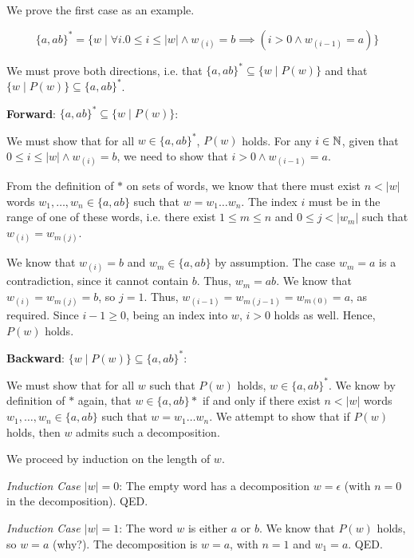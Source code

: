 \begin{exercise}{}
\begin{solution}
    We prove the first case as an example.

    \begin{equation*}
      \{a,ab\}^* = \{w \mid \forall i. 0 \le i \le |w| \land w_{(i)} = b \implies (i > 0 \land w_{(i - 1)} = a)\}
    \end{equation*}

    We must prove both directions, i.e. that \(\{a,ab\}^* \subseteq \{w \mid
    P(w)\}\) and that \(\{w \mid P(w)\} \subseteq \{a,ab\}^*\).

    \noindent
    \textbf{Forward}: \(\{a,ab\}^* \subseteq \{w \mid P(w)\}\):

    We must show that for all \(w \in \{a,ab\}^*\), \(P(w)\) holds. For any \(i
    \in \mathbb{N}\), given that \(0 \le i \le |w| \land w_{(i)} = b\), we need
    to show that \(i > 0 \land w_{(i - 1)} = a\).
    
    From the definition of \(*\) on sets of words, we know that there must exist
    \(n < |w|\) words \(w_1, \ldots, w_n \in \{a, ab\}\) such that \(w = w_1
    \ldots w_n\). The index \(i\) must be in the range of one of these words,
    i.e. there exist \(1 \leq m \leq n\) and \(0 \leq j < |w_m|\) such that
    \(w_{(i)} = w_{m(j)}\). 

    We know that \(w_{(i)} = b\) and \(w_{m} \in \{a, ab\}\) by assumption. The
    case \(w_m = a\) is a contradiction, since it cannot contain \(b\). Thus,
    \(w_m = ab\). We know that \(w_{(i)} = w_{m(j)} = b\), so \(j = 1\). Thus,
    \(w_{(i - 1)} = w_{m(j - 1)} = w_{m(0)} = a\), as required. Since \(i - 1
    \geq 0\), being an index into \(w\), \(i > 0\) holds as well. Hence,
    \(P(w)\) holds.

    \noindent
    \textbf{Backward}: \(\{w \mid P(w)\} \subseteq \{a,ab\}^*\):

    We must show that for all \(w\) such that \(P(w)\) holds, \(w \in
    \{a,ab\}^*\). We know by definition of \(*\) again, that \(w \in \{a,
    ab\}*\) if and only if there exist \(n < |w|\) words \(w_1, \ldots, w_n \in
    \{a, ab\}\) such that \(w = w_1 \ldots w_n\). We attempt to show that if
    \(P(w)\) holds, then \(w\) admits such a decomposition.

    We proceed by induction on the length of \(w\).

    \noindent
    \textit{Induction Case \(|w| = 0\)}: The empty word has a decomposition \(w =
    \epsilon\) (with \(n = 0\) in the decomposition). QED.

    \noindent
    \textit{Induction Case \(|w| = 1\)}: The word \(w\) is either \(a\) or \(b\). We know
    that \(P(w)\) holds, so \(w = a\) (why?). The decomposition is \(w = a\),
    with \(n = 1\) and \(w_1 = a\). QED.


\end{solution}
\end{exercise}

